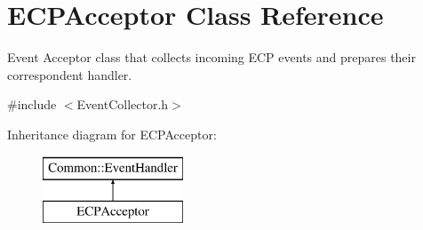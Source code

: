 \hypertarget{class_e_c_p_acceptor}{\section{E\-C\-P\-Acceptor Class Reference}
\label{class_e_c_p_acceptor}
}


Event Acceptor class that collects incoming E\-C\-P events and prepares their correspondent handler.  




{\ttfamily \#include $<$Event\-Collector.\-h$>$}

Inheritance diagram for E\-C\-P\-Acceptor\-:\begin{figure}[H]
\begin{center}
\leavevmode
\includegraphics[height=2.000000cm]{class_e_c_p_acceptor}
\end{center}
\end{figure}
